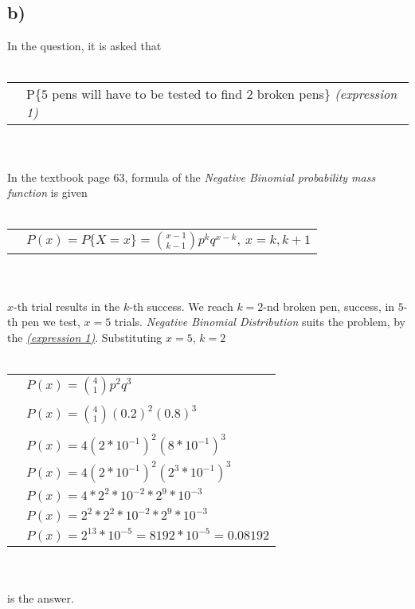 \documentclass[12pt]{article}
\begin{document}
\subsection*{b)}
In the question, it is asked that 
\\ \\
\begin{tabular}{l l}
    &P\{$5$ pens will have to be tested to find $2$ broken pens\} \textit{(expression 1)}\\
\end{tabular}  
\\ \\
In the textbook page 63, formula of the \textit{Negative Binomial probability mass function} is given
\\ \\
\begin{tabular}{l l}
    & $P (x) = P \{X = x\} = \binom {x-1}{k-1} p^kq^{x-k},\ x=k,k+1$\\
\end{tabular}
\\ \\
$x$-th trial results in the $k$-th success. We reach $k=2$-nd broken pen, success, in $5$-th pen we test, $x=5$ trials. \textit{Negative Binomial Distribution}
suits the problem, by the \hyperlink{arg1}{\textit{(expression 1)}}.
Substituting $x=5$, $k=2$ 
\\ \\
\begin{tabular}{l l}
    & $P (x) = \binom {4}{1} p^2q^{3}$\\
    &\\
    & $P (x) = \binom {4}{1} (0.2)^2(0.8)^{3}$\\
    &\\
    & $P (x) = 4 (2*10^{-1})^2(8*10^{-1})^{3}$\\
    & $P (x) = 4 (2*10^{-1})^2(2^3*10^{-1})^{3}$\\
    & $P (x) = 4*2^2*10^{-2}*2^9*10^{-3}$\\
    & $P (x) = 2^2*2^2*10^{-2}*2^9*10^{-3}$\\
    & $P (x) = 2^{13}*10^{-5}=8192*10^{-5}=0.08192$\\
\end{tabular}
\\ \\
is the answer.
\\ \\
\end{document}
